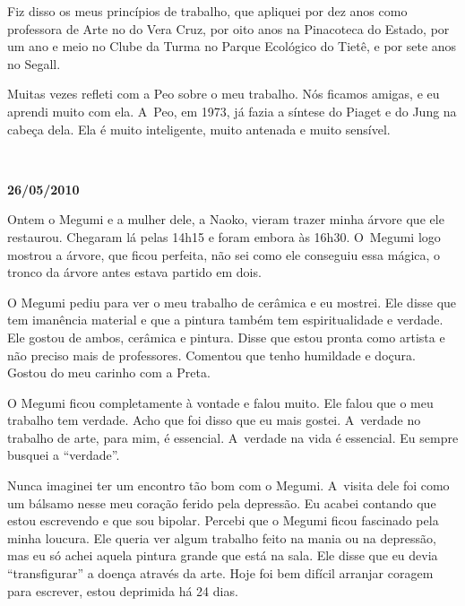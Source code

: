 Fiz disso os meus princípios de trabalho, que apliquei por dez anos como
professora de Arte no   do Vera Cruz, por oito anos na Pinacoteca
do Estado, por um ano e meio no Clube da Turma no Parque Ecológico do
Tietê, e por sete anos no Segall.

Muitas vezes refleti com a Peo sobre o meu trabalho. Nós ficamos amigas,
e eu aprendi muito com ela. A~Peo, em 1973, já fazia a síntese do Piaget
e do Jung na cabeça dela. Ela é muito inteligente, muito antenada e
muito sensível.

\begin{center}\asterisc{}​\end{center}


\begin{flushright}\textbf{26/05/2010}\end{flushright}


Ontem o Megumi e a mulher dele, a Naoko, vieram trazer minha árvore que
ele restaurou. Chegaram lá pelas 14h15 e foram embora às 16h30. O~Megumi
logo mostrou a árvore, que ficou perfeita, não sei como ele conseguiu
essa mágica, o tronco da árvore antes estava partido em dois.

O Megumi pediu para ver o meu trabalho de cerâmica e eu mostrei. Ele
disse que tem imanência material e que a pintura também tem
espiritualidade e verdade. Ele gostou de ambos, cerâmica e pintura.
Disse que estou pronta como artista e não preciso mais de professores.
Comentou que tenho humildade e doçura. Gostou do meu carinho com a
Preta.

O Megumi ficou completamente à vontade e falou muito. Ele falou que o
meu trabalho tem verdade. Acho que foi disso que eu mais gostei. A~verdade no trabalho de arte, para mim, é essencial. A~verdade na vida é
essencial. Eu sempre busquei a ``verdade''.

Nunca imaginei ter um encontro tão bom com o Megumi. A~visita dele foi
como um bálsamo nesse meu coração ferido pela depressão. Eu acabei
contando que estou escrevendo e que sou bipolar. Percebi que o Megumi
ficou fascinado pela minha loucura. Ele queria ver algum trabalho feito
na mania ou na depressão, mas eu só achei aquela pintura grande que está
na sala. Ele disse que eu devia ``transfigurar'' a doença através da
arte. Hoje foi bem difícil arranjar coragem para escrever, estou
deprimida há 24 dias.

\begin{center}\asterisc{}​\end{center}


